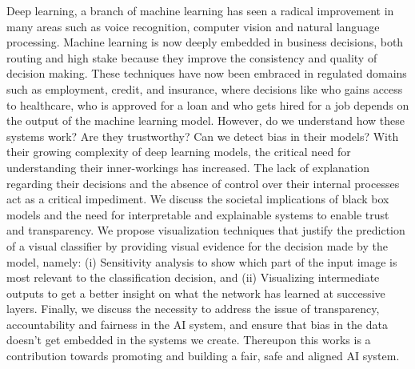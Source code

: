 %
%
%

\begin{publicabstract}

Deep learning, a branch of machine learning has seen a radical improvement in many areas such as voice recognition, computer vision and natural language processing. Machine learning is now deeply embedded in business decisions, both routing and high stake because they improve the consistency and quality of decision making. These techniques have now been embraced in regulated domains such as employment, credit, and insurance, where decisions like who gains access to healthcare, who is approved for a loan and who gets hired for a job depends on the output of the machine learning model. However, do we understand how these systems work? Are they trustworthy? Can we detect bias in their models? With their growing complexity of deep learning models,  the critical need for understanding their inner-workings has increased. The lack of explanation regarding their decisions and the absence of control over their internal processes act as a critical impediment. We discuss the societal implications of black box models and the need for interpretable and explainable systems to enable trust and transparency. We propose visualization techniques that justify the prediction of a visual classifier by providing visual evidence for the decision made by the model, namely: (i) Sensitivity analysis to  show which part of the  input image  is  most  relevant  to  the  classification decision, and (ii) Visualizing intermediate outputs to get a better insight on what the network has learned at successive layers. Finally, we discuss the necessity to address the issue of transparency, accountability and fairness in the AI system, and ensure that bias in the data doesn't get embedded in the systems we create. Thereupon this works is a contribution towards promoting and building a fair, safe and aligned AI system.


\end{publicabstract}


